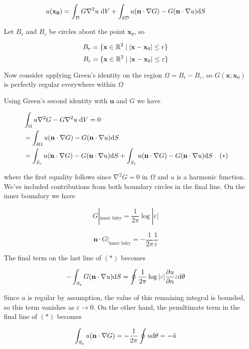 \documentclass[a4paper]{article}
\begin{document}
\[ u(\mathbf{x_{0}}) = \int_{\mathcal{D}} G \nabla^{2} u \; \mathrm{d} V  + \int_{\delta \mathcal{D}} u ( \mathbf{n} \cdot \nabla G ) - G ( \mathbf{n} \cdot \nabla u ) \mathrm{d} S  \]



Let $ B_{r} $ and $ B_{\varepsilon} $ be circles about the point $ \mathbf{x}_{0} $, so

\[ B_{r} = \{ \mathbf{x} \in \mathbb{R}^{2} \; | \; | \mathbf{x} - \mathbf{x}_{0} | \leq r \} \]
\[ B_{\varepsilon} = \{ \mathbf{x} \in \mathbb{R}^{2} \; | \; | \mathbf{x} - \mathbf{x}_{0} | \leq \varepsilon \} \]

Now consider applying Green's identity on the region $ \Omega = B_{r} - B_{\varepsilon} $, so $ G(\mathbf{x};\mathbf{x}_{0}) $ is perfectly regular everywhere within $ \Omega $


 Using Green's second identity with $ \mathbf{u} $ and $ G $ we have

\begin{align*}
& \int_{\Omega}  u \nabla^{2} G  - G \nabla^{2} u \; \mathrm{d} V = 0 \\
& = \int_{\delta \Omega} u ( \mathbf{n} \cdot \nabla G ) - G ( \mathbf{n} \cdot \nabla u ) \mathrm{d} S  \\
& = \int_{S_{r}} u ( \mathbf{n} \cdot \nabla G ) - G ( \mathbf{n} \cdot \nabla u ) \mathrm{d} S + \int_{S_{\varepsilon}} u ( \mathbf{n} \cdot \nabla G ) - G ( \mathbf{n} \cdot \nabla u ) \mathrm{d} S \quad(*)
\end{align*}

where the first equality follows since $ \nabla^{2} G = 0 $ in $ \Omega $ and $ u $ is a harmonic function. We've included contributions from both boundary circles in the final line. On the inner boundary we have

\[ G|_{\text{inner bdry}} = \frac{1}{2\pi} \log | \varepsilon | \]

\[ \mathbf{n} \cdot G|_{\text{inner bdry}} = - \frac{1}{2\pi} \frac{1}{\varepsilon}  \]


The final term on the last line of $ (*) $ becomes

\[ - \int_{S_{\varepsilon}} G ( \mathbf{n} \cdot \nabla u ) \mathrm{d} S =  \oint \frac{1}{2\pi} \log | \varepsilon | \frac{\partial u }{\partial n} \varepsilon \mathrm{d} \theta  \]

Since $ u $ is regular by assumption, the value of this remaining integral is bounded, so this term vanishes as $ \varepsilon \to 0 $. On the other hand, the penultimate term in the final line of $ (*) $ becomes

\[ \int_{S_{\varepsilon}} u ( \mathbf{n} \cdot \nabla G ) = - \frac{1}{2\pi }\oint u \mathrm{d} \theta = - \tilde{u}  \]
\end{document}
